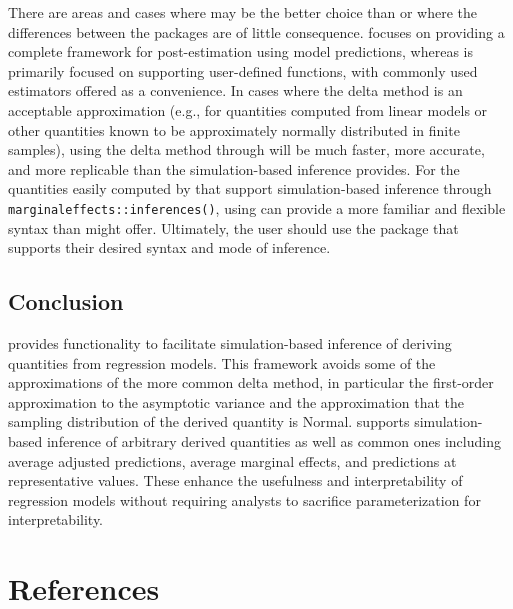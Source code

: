 There are areas and cases where  may be the better choice than  or where the differences between the packages are of little consequence.  focuses on providing a complete framework for post-estimation using model predictions, whereas  is primarily focused on supporting user-defined functions, with commonly used estimators offered as a convenience. In cases where the delta method is an acceptable approximation (e.g., for quantities computed from linear models or other quantities known to be approximately normally distributed in finite samples), using the delta method through  will be much faster, more accurate, and more replicable than the simulation-based inference  provides. For the quantities easily computed by  that support simulation-based inference through \texttt{marginaleffects::inferences()}, using  can provide a more familiar and flexible syntax than  might offer. Ultimately, the user should use the package that supports their desired syntax and mode of inference.

\hypertarget{conclusion}{%
\subsection{Conclusion}\label{conclusion}}

 provides functionality to facilitate simulation-based inference of deriving quantities from regression models. This framework avoids some of the approximations of the more common delta method, in particular the first-order approximation to the asymptotic variance and the approximation that the sampling distribution of the derived quantity is Normal.  supports simulation-based inference of arbitrary derived quantities as well as common ones including average adjusted predictions, average marginal effects, and predictions at representative values. These enhance the usefulness and interpretability of regression models without requiring analysts to sacrifice parameterization for interpretability.

\hypertarget{references}{%
\section*{References}\label{references}}

